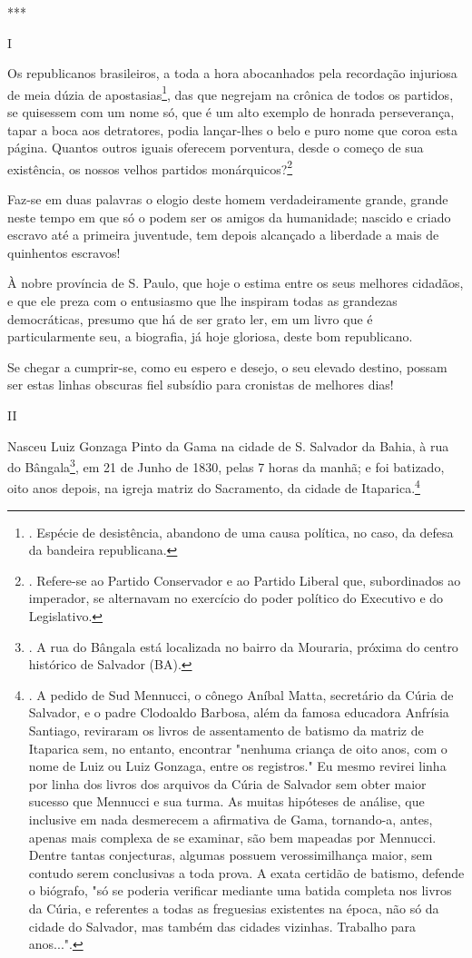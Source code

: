 ***

I

Os republicanos brasileiros, a toda a hora abocanhados pela recordação
injuriosa de meia dúzia de apostasias\footnote{. Espécie de desistência,
  abandono de uma causa política, no caso, da defesa da bandeira
  republicana.}, das que negrejam na crônica de todos os partidos, se
quisessem com um nome só, que é um alto exemplo de honrada perseverança,
tapar a boca aos detratores, podia lançar-lhes o belo e puro nome que
coroa esta página. Quantos outros iguais oferecem porventura, desde o
começo de sua existência, os nossos velhos partidos
monárquicos?\footnote{. Refere-se ao Partido Conservador e ao Partido
  Liberal que, subordinados ao imperador, se alternavam no exercício do
  poder político do Executivo e do Legislativo.}

Faz-se em duas palavras o elogio deste homem verdadeiramente grande,
grande neste tempo em que só o podem ser os amigos da humanidade;
nascido e criado escravo até a primeira juventude, tem depois alcançado
a liberdade a mais de quinhentos escravos!

À nobre província de S. Paulo, que hoje o estima entre os seus melhores
cidadãos, e que ele preza com o entusiasmo que lhe inspiram todas as
grandezas democráticas, presumo que há de ser grato ler, em um livro que
é particularmente seu, a biografia, já hoje gloriosa, deste bom
republicano.

Se chegar a cumprir-se, como eu espero e desejo, o seu elevado destino,
possam ser estas linhas obscuras fiel subsídio para cronistas de
melhores dias!

II

Nasceu Luiz Gonzaga Pinto da Gama na cidade de S. Salvador da Bahia, à
rua do Bângala\footnote{. A rua do Bângala está localizada no bairro da
  Mouraria, próxima do centro histórico de Salvador (BA).}, em 21 de
Junho de 1830, pelas 7 horas da manhã; e foi batizado, oito anos depois,
na igreja matriz do Sacramento, da cidade de Itaparica.\footnote{. A
  pedido de Sud Mennucci, o cônego Aníbal Matta, secretário da Cúria de
  Salvador, e o padre Clodoaldo Barbosa, além da famosa educadora
  Anfrísia Santiago, reviraram os livros de assentamento de batismo da
  matriz de Itaparica sem, no entanto, encontrar "nenhuma criança de
  oito anos, com o nome de Luiz ou Luiz Gonzaga, entre os registros." Eu
  mesmo revirei linha por linha dos livros dos arquivos da Cúria de
  Salvador sem obter maior sucesso que Mennucci e sua turma. As muitas
  hipóteses de análise, que inclusive em nada desmerecem a afirmativa de
  Gama, tornando-a, antes, apenas mais complexa de se examinar, são bem
  mapeadas por Mennucci. Dentre tantas conjecturas, algumas possuem
  verossimilhança maior, sem contudo serem conclusivas a toda prova. A
  exata certidão de batismo, defende o biógrafo, "só se poderia
  verificar mediante uma batida completa nos livros da Cúria, e
  referentes a todas as freguesias existentes na época, não só da cidade
  do Salvador, mas também das cidades vizinhas. Trabalho para anos...".}

